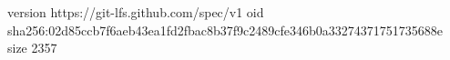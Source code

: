 version https://git-lfs.github.com/spec/v1
oid sha256:02d85ccb7f6aeb43ea1fd2fbac8b37f9c2489cfe346b0a33274371751735688e
size 2357
